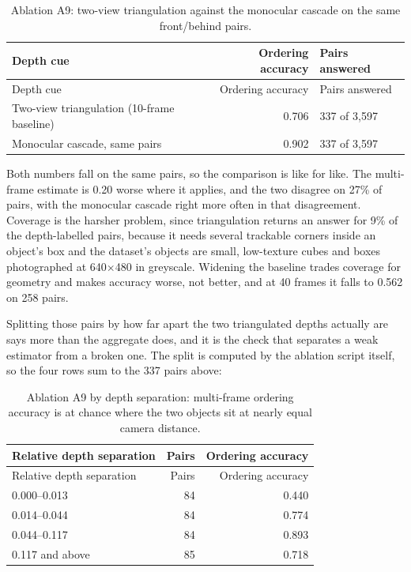 \begin{center}
\setlength{\tabcolsep}{6pt}
\small
\begin{longtable}{lrl}
\caption[Ablation A9]{Ablation A9: two-view triangulation against the monocular cascade on the same front/behind pairs.}\\
\hline
Depth cue & Ordering accuracy & Pairs answered \\
\hline
\endfirsthead
\hline
Depth cue & Ordering accuracy & Pairs answered \\
\hline
\endhead
Two-view triangulation (10-frame baseline) & 0.706 & 337 of 3,597 \\
Monocular cascade, same pairs & 0.902 & 337 of 3,597 \\
\hline
\end{longtable}
\end{center}

Both numbers fall on the same pairs, so the comparison is like for like. The multi-frame estimate is 0.20 worse where it applies, and the two disagree on 27\% of pairs, with the monocular cascade right more often in that disagreement. Coverage is the harsher problem, since triangulation returns an answer for 9\% of the depth-labelled pairs, because it needs several trackable corners inside an object's box and the dataset's objects are small, low-texture cubes and boxes photographed at 640$\times$480 in greyscale. Widening the baseline trades coverage for geometry and makes accuracy worse, not better, and at 40 frames it falls to 0.562 on 258 pairs.

Splitting those pairs by how far apart the two triangulated depths actually are says more than the aggregate does, and it is the check that separates a weak estimator from a broken one. The split is computed by the ablation script itself, so the four rows sum to the 337 pairs above:

\begin{center}
\setlength{\tabcolsep}{6pt}
\small
\begin{longtable}{lrr}
\caption[Ablation A9 by depth separation]{Ablation A9 by depth separation: multi-frame ordering accuracy is at chance where the two objects sit at nearly equal camera distance.}\\
\hline
Relative depth separation & Pairs & Ordering accuracy \\
\hline
\endfirsthead
\hline
Relative depth separation & Pairs & Ordering accuracy \\
\hline
\endhead
0.000--0.013 & 84 & 0.440 \\
0.014--0.044 & 84 & 0.774 \\
0.044--0.117 & 84 & 0.893 \\
0.117 and above & 85 & 0.718 \\
\hline
\end{longtable}
\end{center}

